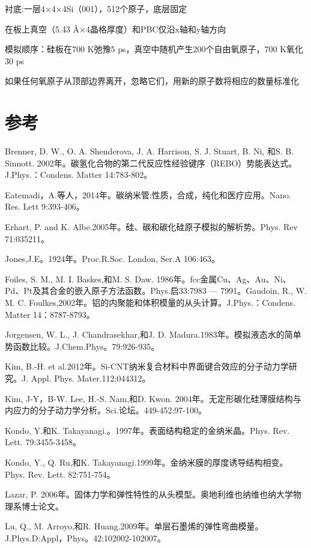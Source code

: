 
衬底:一层4×4×4Si（001），512个原子，底层固定

在板上真空（5.43 Å×4晶格厚度）和PBC仅沿x轴和y轴方向

模拟顺序：硅板在700 K弛豫5 ps，真空中随机产生200个自由氧原子，700
K氧化30 ps

如果任何氧原子从顶部边界离开，忽略它们，用新的原子数将相应的数量标准化

\hypertarget{ux53c2ux8003}{%
\section{参考}\label{ux53c2ux8003}}

Brenner, D. W., O. A. Shenderova, J. A. Harrison, S. J. Stuart, B. Ni,
和S. B. Sinnott.
2002年。碳氢化合物的第二代反应性经验键序（REBO）势能表达式。J.Phys.：Condens.
Matter 14:783-802。

Eatemadi，A.等人，2014年。碳纳米管:性质，合成，纯化和医疗应用。Nano.
Res. Lett 9:393-406。

Erhart, P. and K. Albe.2005年。硅、碳和碳化硅原子模拟的解析势。Phys. Rev
71:035211。

Jones,J.E。1924年。Proc.R.Soc. London, Ser.A 106:463。

Foiles, S. M., M. I. Baskes,和M. S. Daw.
1986年。fcc金属Cu、Ag、Au、Ni、Pd、Pt及其合金的嵌入原子方法函数。Phys.启33:7983
--- 7991。Gaudoin, R., W. M. C.
Foulkes,2002年。铝的内聚能和体积模量的从头计算。J.Phys.：Condens. Matter
14：8787-8793。

Jorgensen, W. L., J. Chandrasekhar,和J. D.
Madura.1983年。模拟液态水的简单势函数比较。J.Chem.Phys。79:926-935。

Kim, B.-H. et
al.2012年。Si-CNT纳米复合材料中界面键合效应的分子动力学研究。J. Appl.
Phys. Mater.112:044312。

Kim, J-Y，B-W. Lee, H.-S. Nam,和D. Kwon.
2004年。无定形碳化硅薄膜结构与内应力的分子动力学分析。Sci.论坛。449-452:97-100。

Kondo, Y.和K. Takayanagi.。1997年。表面结构稳定的金纳米晶。Phys. Rev.
Lett. 79:3455-3458。

Kondo, Y., Q. Ru,和K.
Takayanagi.1999年。金纳米膜的厚度诱导结构相变。Phys. Rev. Lett.
82:751-754。

Lazar, P.
2006年。固体力学和弹性特性的从头模型。奥地利维也纳维也纳大学物理系博士论文。

Lu, Q., M. Arroyo,和R.
Huang.2009年。单层石墨烯的弹性弯曲模量。J.Phys.D:Appl，Phys。42:102002-102007。

